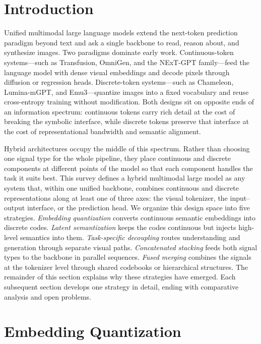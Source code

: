 \documentclass[manuscript,screen,review]{acmart}
\begin{document}
\maketitle

\section{Introduction}

Unified multimodal large language models extend the next-token
prediction paradigm beyond text and ask a single backbone to read,
reason about, and synthesize images. Two paradigms dominate early work.
Continuous-token systems---such as Transfusion, OmniGen, and the
NExT-GPT family---feed the language model with dense visual embeddings
and decode pixels through diffusion or regression heads. Discrete-token
systems---such as Chameleon, Lumina-mGPT, and Emu3---quantize images
into a fixed vocabulary and reuse cross-entropy training without
modification. Both designs sit on opposite ends of an information
spectrum: continuous tokens carry rich detail at the cost of breaking
the symbolic interface, while discrete tokens preserve that interface
at the cost of representational bandwidth and semantic alignment.

Hybrid architectures occupy the middle of this spectrum. Rather than
choosing one signal type for the whole pipeline, they place continuous
and discrete components at different points of the model so that each
component handles the task it suits best. This survey defines a hybrid
multimodal large model as any system that, within one unified backbone,
combines continuous and discrete representations along at least one of
three axes: the visual tokenizer, the input--output interface, or the
prediction head. We organize this design space into five strategies.
\textit{Embedding quantization} converts continuous semantic embeddings
into discrete codes. \textit{Latent semantization} keeps the codes
continuous but injects high-level semantics into them.
\textit{Task-specific decoupling} routes understanding and generation
through separate visual paths. \textit{Concatenated stacking} feeds
both signal types to the backbone in parallel sequences.
\textit{Fused merging} combines the signals at the tokenizer level
through shared codebooks or hierarchical structures. The remainder of
this section explains why these strategies have emerged. Each
subsequent section develops one strategy in detail, ending with
comparative analysis and open problems.

\section{Embedding Quantization}
\end{document}

